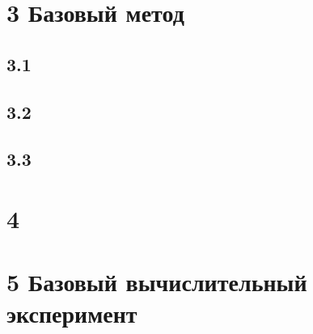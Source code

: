 \documentclass[12pt,twoside]{article}
\begin{document}
\section{3 Базовый метод}

\subsection{3.1 }

\subsection{3.2 }

\subsection{3.3 }

\section{4}

\section{5 Базовый вычислительный эксперимент}

	


\end{document}
